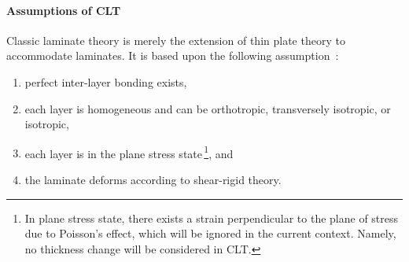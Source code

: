 \paragraph{Assumptions of CLT} Classic laminate theory is merely the extension of thin plate theory to accommodate laminates. It is based upon the following assumption~\autocite{Herakovich.1998}:
    \begin{enumerate}
        \item perfect inter-layer bonding exists,
        \item each layer is homogeneous and can be orthotropic, transversely isotropic, or isotropic,
        \item each layer is in the plane stress state\,\footnote{In plane stress state, there exists a strain perpendicular to the plane of stress due to Poisson's effect, which will be ignored in the current context. Namely, no thickness change will be considered in CLT.}, and
        \item the laminate deforms according to shear-rigid theory.
    \end{enumerate}



